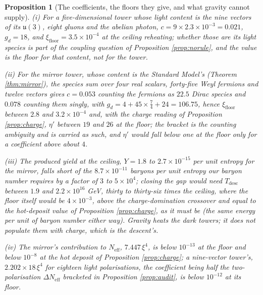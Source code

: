 \documentclass[11pt]{article}
\newtheorem{proposition}[theorem]{Proposition}
\theoremstyle{definition}
\newcommand{\Neff}{N_{\mathrm{eff}}}
\begin{document}
\begin{proposition}[The coefficients, the floors they give, and what gravity cannot supply]\label{prop:coefficients}
(i) For a five-dimensional tower whose light content is the nine vectors of its $\mathfrak{u}(3)$, eight gluons and the abelian photon, $c = 9 \times 2.3 \times 10^{-3} = 0.021$, $g_{d} = 18$, and $\xi_{\mathrm{floor}} = 3.5 \times 10^{-4}$ at the ceiling reheating; whether those are its light species is part of the coupling question of Proposition \ref{prop:norule}, and the value is the floor for that content, not for the tower.

(ii) For the mirror tower, whose content is the Standard Model's (Theorem \ref{thm:mirror}), the species sum over four real scalars, forty-five Weyl fermions and twelve vectors gives $c = 0.053$ counting the fermions as $22.5$ Dirac species and $0.078$ counting them singly, with $g_{d} = 4 + 45 \times \tfrac{7}{4} + 24 = 106.75$, hence $\xi_{\mathrm{floor}}$ between $2.8$ and $3.2 \times 10^{-4}$ and, with the charge reading of Proposition \ref{prop:charge}, $\eta'$ between $19$ and $26$ at the floor; the bracket is the counting ambiguity and is carried as such, and $\eta'$ would fall below one at the floor only for a coefficient above about $4$.

(iii) The produced yield at the ceiling, $Y = 1.8$ to $2.7 \times 10^{-15}$ per unit entropy for the mirror, falls short of the $8.7 \times 10^{-11}$ baryons per unit entropy our baryon number requires by a factor of $3$ to $5 \times 10^{4}$; closing the gap would need $T_{\mathrm{desc}}$ between $1.9$ and $2.2 \times 10^{16}$ GeV, thirty to thirty-six times the ceiling, where the floor itself would be $4 \times 10^{-3}$, above the charge-domination crossover and equal to the hot-deposit value of Proposition \ref{prop:charge}, as it must be (the same energy per unit of baryon number either way). Gravity heats the dark towers; it does not populate them with charge, which is the descent's.

(iv) The mirror's contribution to $\Neff$, $7.447\,\xi^{4}$, is below $10^{-13}$ at the floor and below $10^{-8}$ at the hot deposit of Proposition \ref{prop:charge}; a nine-vector tower's, $2.202 \times 18\,\xi^{4}$ for eighteen light polarisations, the coefficient being half the two-polarisation $\Delta\Neff$ bracketed in Proposition \ref{prop:audit}, is below $10^{-12}$ at its floor.
\end{proposition}
\end{document}
